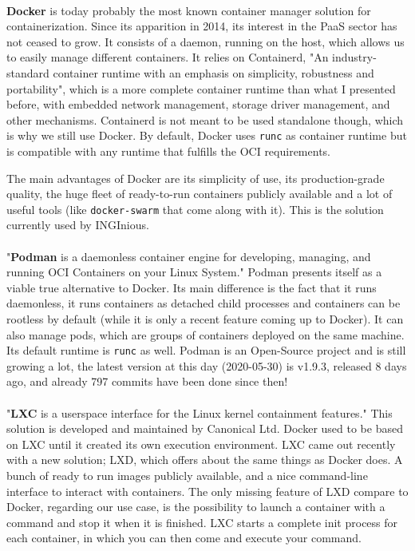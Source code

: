 \paragraph{}\textbf{Docker}\cite{merkel2014docker} is today probably the most known container manager solution for containerization.  Since its apparition in 2014, its interest in the PaaS sector has not ceased to grow.  It consists of a daemon, running on the host, which allows us to easily manage different containers.  It relies on Containerd, "An industry-standard container runtime with an emphasis on simplicity, robustness and portability"\cite{containerd}, which is a more complete container runtime than what I presented before, with embedded network management, storage driver management, and other mechanisms.  Containerd is not meant to be used standalone though, which is why we still use Docker.  By default, Docker uses \texttt{runc} as container runtime but is compatible with any runtime that fulfills the OCI\cite{oci} requirements.

The main advantages of Docker are its simplicity of use, its production-grade quality, the huge fleet of ready-to-run containers publicly available and a lot of useful tools (like \texttt{docker-swarm} that come along with it).  This is the solution currently used by INGInious.

\paragraph{}"\textbf{Podman} is a daemonless container engine for developing, managing, and running OCI\cite{oci} Containers on your Linux System."\cite{podman}  Podman presents itself as a viable true alternative to Docker.  Its main difference is the fact that it runs daemonless, it runs containers as detached child processes and containers can be rootless by default (while it is only a recent feature coming up to Docker).  It can also manage pods, which are groups of containers deployed on the same machine. Its default runtime is \texttt{runc} as well.  Podman is an Open-Source project and is still growing a lot, the latest version at this day (2020-05-30) is v1.9.3, released 8 days ago, and already 797 commits have been done since then!

\paragraph{}"\textbf{LXC} is a userspace interface for the Linux kernel containment features."\cite{lxc}  This solution is developed and maintained by Canonical Ltd.  Docker used to be based on LXC until it created its own execution environment.  LXC came out recently with a new solution; LXD, which offers about the same things as Docker does.  A bunch of ready to run images publicly available, and a nice command-line interface to interact with containers.  The only missing feature of LXD compare to Docker, regarding our use case, is the possibility to launch a container with a command and stop it when it is finished.  LXC starts a complete init process for each container, in which you can then come and execute your command.

